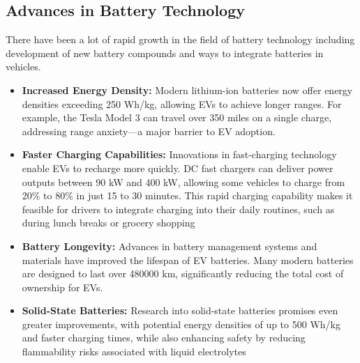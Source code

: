 \documentclass[a4paper,12pt]{report}
\begin{document}
\subsection{Advances in Battery Technology}
There have been a lot of rapid growth in the field of battery technology including development of new battery compounds and ways to integrate batteries in vehicles. 
\begin{itemize}
    \item \textbf{Increased Energy Density: }
    Modern lithium-ion batteries now offer energy densities exceeding 250 Wh/kg, allowing EVs to achieve longer ranges. For example, the Tesla Model 3 can travel over 350 miles on a single charge, addressing range anxiety—a major barrier to EV adoption.

    \item \textbf{Faster Charging Capabilities: }
    Innovations in fast-charging technology enable EVs to recharge more quickly. DC fast chargers can deliver power outputs between 90 kW and 400 kW, allowing some vehicles to charge from 20\% to 80\% in just 15 to 30 minutes. This rapid charging capability makes it feasible for drivers to integrate charging into their daily routines, such as during lunch breaks or grocery shopping

    \item \textbf{Battery Longevity: }
    Advances in battery management systems and materials have improved the lifespan of EV batteries. Many modern batteries are designed to last over 480000 km, significantly reducing the total cost of ownership for EVs.

    \item \textbf{Solid-State Batteries: }
    Research into solid-state batteries promises even greater improvements, with potential energy densities of up to 500 Wh/kg and faster charging times, while also enhancing safety by reducing flammability risks associated with liquid electrolytes
    
\end{itemize}
\end{document}
